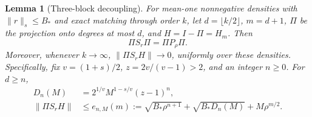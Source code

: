 \documentclass[11pt]{article}
\newtheorem{lemma}[theorem]{Lemma}
\begin{document}
\begin{lemma}[Three-block decoupling]
\label{lem:335-cross}
For mean-one nonnegative densities with $\|r\|_s\le B_*$ and exact
matching through order $k$, let $d=\lfloor k/2\rfloor$, $m=d+1$,
$\Pi$ be the projection onto degrees at most $d$, and $H=I-\Pi=H_m$.
Then
\begin{equation}\label{eq:335-compression}
 \Pi S_r\Pi=\Pi P_\rho\Pi.
\end{equation}
Moreover, whenever $k\to\infty$,
$\|\Pi S_rH\|\to0$, uniformly over these densities. Specifically,
fix $v=(1+s)/2$, $z=2v/(v-1)>2$, and an integer $n\ge0$. For $d\ge n$,
\begin{align}
 D_n(M)&=2^{1/v}M^{1-s/v}(z-1)^n,\label{eq:335-D}\\
 \|\Pi S_rH\|&\le e_{n,M}(m)
 :=\sqrt{B_*\rho^{n+1}}+\sqrt{B_*D_n(M)}+M\rho^{m/2}.
 \label{eq:335-cross-bound}
\end{align}
\end{lemma}
\end{document}
